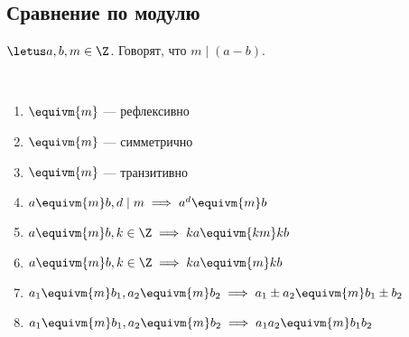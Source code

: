 \subsection{Сравнение по модулю}

\begin{defn}
    $\letus a, b, m \in \Z$. Говорят, что $m \mid (a - b)$.
\end{defn}

\begin{prop}~

    \begin{enumerate}
        \item $\equivm{m}$ --- рефлексивно
    
        \item $\equivm{m}$ --- симметрично
    
        \item $\equivm{m}$ --- транзитивно
    
        \item $a \equivm{m} b, d \mid m \implies a^d \equivm{m} b$
    
        \item $a \equivm{m} b, k \in \Z \implies ka \equivm{km} kb$
    
        \item $a \equivm{m} b, k \in \Z \implies ka \equivm{m} kb$
    
        \item $a_1 \equivm{m} b_1, a_2 \equivm{m} b_2 \implies a_1 \pm a_2 \equivm{m} b_1 \pm b_2$
    
        \item $a_1 \equivm{m} b_1, a_2 \equivm{m} b_2 \implies a_1 a_2 \equivm{m} b_1 b_2$
    \end{enumerate}
\end{prop}